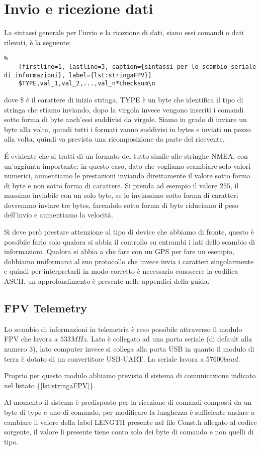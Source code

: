 
\chapter{Invio e ricezione dati}
La sintassi generale per l'invio e la ricezione di dati, siano essi comandi o dati rilevati, è la seguente:
\begin{lstlisting}%
	[firstline=1, lastline=3, caption={sintassi per lo scambio seriale di informazioni}, label={lst:stringaFPV}]
	$TYPE,val_1,val_2,...,val_n*checksum\n
\end{lstlisting}
dove \$ è il carattere di inizio stringa, TYPE è un byte che identifica il tipo di stringa che stiamo inviando, dopo la virgola invece vengono inseriti i comandi sotto forma di byte anch'essi suddivisi da virgole. Siamo in grado di inviare un byte alla volta, quindi tutti i formati vanno suddivisi in bytes e inviati un pezzo alla volta, quindi va prevista una ricomposizione da parte del ricevente.

\'E evidente che si tratti di un formato del tutto simile alle stringhe NMEA, con un'aggiunta importante: in questo caso, dato che vogliamo scambiare solo valori numerici, aumentiamo le prestazioni inviando direttamente il valore sotto forma di byte e non sotto forma di carattere.\newline
Si prenda ad esempio il valore $255$, il massimo inviabile con un solo byte, se lo inviassimo sotto forma di caratteri dovremmo inviare tre bytes, facendolo sotto forma di byte riduciamo il peso dell'invio e aumentiamo la velocità.

Si deve però prestare attenzione al tipo di device che abbiamo di fronte, questo è possibile farlo solo qualora si abbia il controllo su entrambi i lati dello scambio di informazioni. Qualora si abbia a che fare con un GPS per fare un esempio, dobbiamo uniformarci al suo protocollo che invece invia i caratteri singolarmente e quindi per interpretarli in modo corretto è necessario conoscere la codifica ASCII, un approfondimento è presente nelle appendici della guida.

\section{FPV Telemetry}
Lo scambio di informazioni in telemetria è reso possibile attraverso il modulo FPV che lavora a $533MHz$. Lato \name è collegato ad una porta seriale (di default alla numero 3), lato computer invece si collega alla porta USB in quanto il modulo di terra è dotato di un convertitore USB-UART. La seriale lavora a $57600 baud$.

Proprio per questo modulo abbiamo previsto il sistema di comunicazione indicato nel listato \{\ref{lst:stringaFPV}\}.

Al momento il sistema è predisposto per la ricezione di comandi composti da un byte di type e uno di comando, per modificare la lunghezza è sufficiente andare a cambiare il valore della label LENGTH presente nel file Const.h allegato al codice sorgente, il valore li presente tiene conto solo dei byte di comando e non quelli di tipo.

